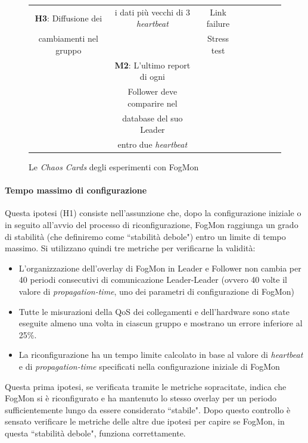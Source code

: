 \begin{figure} [H]
\begin{center}
\begin{center}
\begin{tabular}{|c|c|c|c|c|c|c|c|}
                    \textbf{H3}: Diffusione dei & i dati più vecchi di 3 \textit{heartbeat} & Link failure\\
                    cambiamenti nel gruppo & & Stress test\\
                    & \textbf{M2}: L'ultimo report di ogni & \\
                    & Follower deve comparire nel &\\
                    & database del suo Leader &\\
                    &  entro due \textit{heartbeat} &\\
                    \hline
                \end{tabular}
            \end{center}
            \caption {{Le \textit{Chaos Cards} degli esperimenti con FogMon}}
            \label {fig:cards}
        \end{center}
    \end{figure}
    
    \paragraph{Tempo massimo di configurazione} 
    Questa ipotesi (H1) consiste nell'assunzione che, dopo la configurazione iniziale o in seguito all'avvio del processo di riconfigurazione, FogMon raggiunga un grado di stabilità (che definiremo come ``stabilità debole") entro un limite di tempo massimo. Si utilizzano quindi tre metriche per verificarne la validità:
    \begin{itemize}
        \item L'organizzazione dell'overlay di FogMon in Leader e Follower non cambia per 40 periodi consecutivi di comunicazione Leader-Leader (ovvero 40 volte il valore di \textit{propagation-time}, uno dei parametri di configurazione di FogMon)
        \item Tutte le misurazioni della QoS dei collegamenti e dell'hardware sono state eseguite almeno una volta in ciascun gruppo e mostrano un errore inferiore al 25\%.
        \item La riconfigurazione ha un tempo limite calcolato in base al valore di \textit{heartbeat} e di \textit{propagation-time} specificati nella configurazione iniziale di FogMon
    \end{itemize}
    Questa prima ipotesi, se verificata tramite le metriche sopracitate, indica che FogMon si è riconfigurato e ha mantenuto lo stesso overlay per un periodo sufficientemente lungo da essere considerato ``stabile". Dopo questo controllo è sensato verificare le metriche delle altre due ipotesi per capire se FogMon, in questa ``stabilità debole", funziona correttamente.
    
